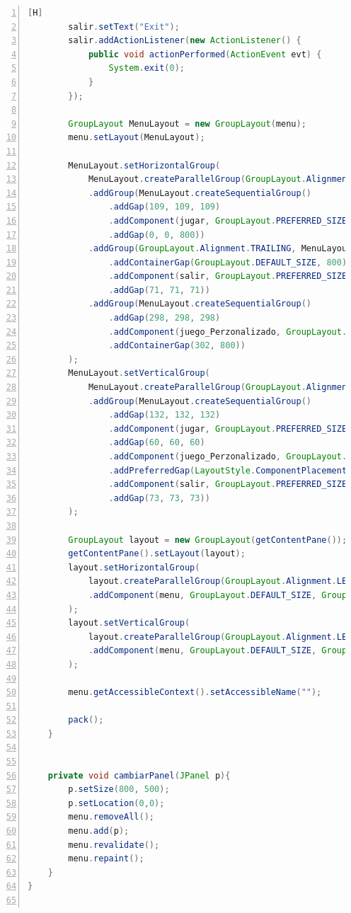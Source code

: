 \documentclass{article}
\begin{document}
\begin{lstlisting}[language=Java,caption={Analizando codigo generado por NeatBeans},numbers=left,][H]
        salir.setText("Exit");
        salir.addActionListener(new ActionListener() {
            public void actionPerformed(ActionEvent evt) {
                System.exit(0);
            }
        });

        GroupLayout MenuLayout = new GroupLayout(menu);
        menu.setLayout(MenuLayout);

        MenuLayout.setHorizontalGroup(
            MenuLayout.createParallelGroup(GroupLayout.Alignment.LEADING)
            .addGroup(MenuLayout.createSequentialGroup()
                .addGap(109, 109, 109)
                .addComponent(jugar, GroupLayout.PREFERRED_SIZE, 200, GroupLayout.PREFERRED_SIZE)
                .addGap(0, 0, 800))
            .addGroup(GroupLayout.Alignment.TRAILING, MenuLayout.createSequentialGroup()
                .addContainerGap(GroupLayout.DEFAULT_SIZE, 800)
                .addComponent(salir, GroupLayout.PREFERRED_SIZE, 200, GroupLayout.PREFERRED_SIZE)
                .addGap(71, 71, 71))
            .addGroup(MenuLayout.createSequentialGroup()
                .addGap(298, 298, 298)
                .addComponent(juego_Perzonalizado, GroupLayout.PREFERRED_SIZE, 200, GroupLayout.PREFERRED_SIZE)
                .addContainerGap(302, 800))
        );
        MenuLayout.setVerticalGroup(
            MenuLayout.createParallelGroup(GroupLayout.Alignment.LEADING)
            .addGroup(MenuLayout.createSequentialGroup()
                .addGap(132, 132, 132)
                .addComponent(jugar, GroupLayout.PREFERRED_SIZE, 45, GroupLayout.PREFERRED_SIZE)
                .addGap(60, 60, 60)
                .addComponent(juego_Perzonalizado, GroupLayout.PREFERRED_SIZE, 45, GroupLayout.PREFERRED_SIZE)
                .addPreferredGap(LayoutStyle.ComponentPlacement.RELATED, 100, 800)
                .addComponent(salir, GroupLayout.PREFERRED_SIZE, 45, GroupLayout.PREFERRED_SIZE)
                .addGap(73, 73, 73))
        );

        GroupLayout layout = new GroupLayout(getContentPane());
        getContentPane().setLayout(layout);
        layout.setHorizontalGroup(
            layout.createParallelGroup(GroupLayout.Alignment.LEADING)
            .addComponent(menu, GroupLayout.DEFAULT_SIZE, GroupLayout.DEFAULT_SIZE, 800)
        );
        layout.setVerticalGroup(
            layout.createParallelGroup(GroupLayout.Alignment.LEADING)
            .addComponent(menu, GroupLayout.DEFAULT_SIZE, GroupLayout.DEFAULT_SIZE, 800)
        );

        menu.getAccessibleContext().setAccessibleName("");

        pack();
    }


    private void cambiarPanel(JPanel p){
        p.setSize(800, 500);
        p.setLocation(0,0);
        menu.removeAll();
        menu.add(p);
        menu.revalidate();
        menu.repaint();
    }
}


\end{lstlisting}
\end{document}
